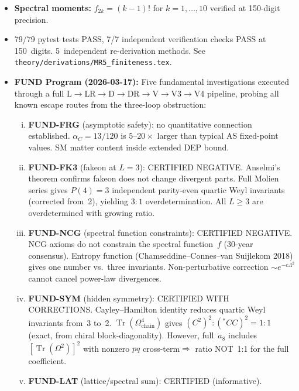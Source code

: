 \documentclass[12pt,a4paper]{article}
\newcommand{\Tr}{\operatorname{Tr}}
\begin{document}
\begin{itemize}
    Physical $D=0$ at $L=2$ is UNCONDITIONAL (MR-5b via CHIRAL-Q Theorem~6.12):
    on-shell CCC absorption established by chirality structure.
  \item \textbf{Spectral moments:} $f_{2k} = (k-1)!$ for $k = 1,\ldots,10$
    verified at 150-digit precision.
  \item 79/79 pytest tests PASS, 7/7 independent verification checks PASS
    at 150~digits. 5~independent re-derivation methods.
    See \texttt{theory/derivations/MR5\_finiteness.tex}.
  \item \textbf{FUND Program (2026-03-17):} Five fundamental investigations
    executed through a full L$\to$LR$\to$D$\to$DR$\to$V$\to$V3$\to$V4 pipeline,
    probing all known escape routes from the three-loop obstruction:
    \begin{enumerate}[(i)]
      \item \textbf{FUND-FRG} (asymptotic safety): no quantitative connection
        established. $\alpha_C = 13/120$ is $5$--$20\times$ larger than typical
        AS fixed-point values. SM matter content inside extended DEP bound.
      \item \textbf{FUND-FK3} (fakeon at $L=3$): \textcolor{long}{CERTIFIED NEGATIVE.}
        Anselmi's theorem confirms fakeon does not change divergent parts.
        Full Molien series gives $P(4)=3$ independent parity-even quartic
        Weyl invariants (corrected from~2), yielding $3{:}1$ overdetermination.
        All $L\geq 3$ are overdetermined with growing ratio.
      \item \textbf{FUND-NCG} (spectral function constraints):
        \textcolor{long}{CERTIFIED NEGATIVE.}
        NCG axioms do not constrain the spectral function~$f$ (30-year consensus).
        Entropy function (Chamseddine--Connes--van Suijlekom 2018) gives one number
        vs.~three invariants. Non-perturbative correction $\sim e^{-c\Lambda^2}$
        cannot cancel power-law divergences.
      \item \textbf{FUND-SYM} (hidden symmetry): \textcolor{near}{CERTIFIED WITH CORRECTIONS.}
        Cayley--Hamilton identity reduces quartic Weyl invariants from~3 to~2.
        $\Tr(\Omega^4_{\mathrm{chain}})$ gives $(C^2)^2{:}({}^*CC)^2 = 1{:}1$
        (exact, from chiral block-diagonality). However, full~$a_8$ includes
        $[\Tr(\Omega^2)]^2$ with nonzero $pq$ cross-term$\Rightarrow$ ratio
        NOT~1:1 for the full coefficient.
      \item \textbf{FUND-LAT} (lattice/spectral sum): \textcolor{near}{CERTIFIED (informative).}

\end{enumerate}
\end{itemize}
\end{document}
